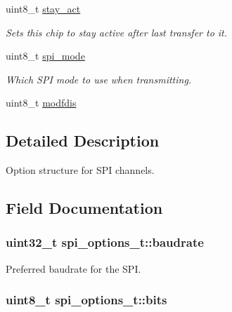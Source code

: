 \begin{DoxyCompactItemize}
uint8\-\_\-t \hyperlink{structspi__options__t_a9bbd0582cc9fb1f01aaba5761f139119}{stay\-\_\-act}
\begin{DoxyCompactList}\small\item\em \-Sets this chip to stay active after last transfer to it. \end{DoxyCompactList}\item 
uint8\-\_\-t \hyperlink{structspi__options__t_aeb3e5bbe92bd45feadb8fc3abe2ea402}{spi\-\_\-mode}
\begin{DoxyCompactList}\small\item\em \-Which \-S\-P\-I mode to use when transmitting. \end{DoxyCompactList}\item 
uint8\-\_\-t \hyperlink{structspi__options__t_a734ad2abb63f00b69a38ef1eb7c68812}{modfdis}
\end{DoxyCompactItemize}


\subsection{\-Detailed \-Description}
\-Option structure for \-S\-P\-I channels. 

\subsection{\-Field \-Documentation}
\hypertarget{structspi__options__t_a397070a4a1f42ac5c8e45538b0cd0163}{
\subsubsection[{baudrate}]{\setlength{\rightskip}{0pt plus 5cm}uint32\-\_\-t {\bf spi\-\_\-options\-\_\-t\-::baudrate}}}
\label{structspi__options__t_a397070a4a1f42ac5c8e45538b0cd0163}


\-Preferred baudrate for the \-S\-P\-I. 

\hypertarget{structspi__options__t_a99da3363b981ddff67b8463f760ac22d}{
\subsubsection[{bits}]{\setlength{\rightskip}{0pt plus 5cm}uint8\-\_\-t {\bf spi\-\_\-options\-\_\-t\-::bits}}}
\label{structspi__options__t_a99da3363b981ddff67b8463f760ac22d}


